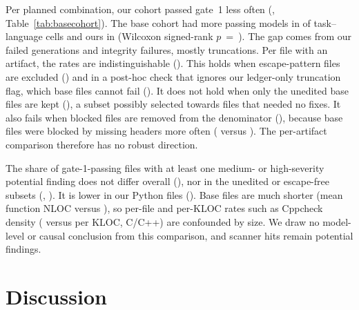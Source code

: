 \documentclass[conference]{IEEEtran}
\begin{document}
Per planned combination, our cohort passed gate~1 less often
(\cohDiffPlanned{}, Table~\ref{tab:basecohort}). The base cohort had more
passing models in \cohCellsBaseHigher{} of \cohCells{} task--language cells and
ours in \cohCellsOursHigher{} (Wilcoxon signed-rank $p$~=~\cohWilcoxonP{}). The gap
comes from our \oursNNoArtifactCCpp{} failed generations and
\oursNIntegrityCCpp{} integrity failures, mostly truncations. Per file with an
artifact, the rates are indistinguishable (\cohDiffArtifact{}). This holds when
escape-pattern files are excluded (\cohDiffArtifactSTwo{}) and in a post-hoc
check that ignores our ledger-only truncation flag, which base files cannot fail
(\cohDiffArtifactSFour{}). It does not hold when only the \baseNIdentical{}
unedited base files are kept (\cohDiffArtifactSOne{}), a subset possibly
selected towards files that needed no fixes. It also fails when blocked files
are removed from the denominator (\cohDiffArtifactSThree{}), because base files
were blocked by missing headers more often (\baseNBlocked{} versus
\oursNBlockedCCpp{}). The per-artifact comparison therefore has no robust
direction.

The share of gate-1-passing files with at least one medium- or high-severity
potential finding does not differ overall (\cohDiffMedHigh{}), nor in the
unedited or escape-free subsets (\cohDiffMedHighSOne{}, \cohDiffMedHighSTwo{}).
It is lower in our Python files (\cohDiffMedHighPy{}). Base files are much
shorter (mean function NLOC \cohNlocBase{} versus \cohNlocOurs{}), so per-file
and per-KLOC rates such as Cppcheck density (\cohCppcheckBase{} versus
\cohCppcheckOurs{} per KLOC, C/C++) are confounded by size. We draw no
model-level or causal conclusion from this comparison, and scanner hits remain
potential findings.

\begin{table}[t]
\centering
\caption{Secondary cohort comparison, ours / base study published outputs (\%,
except NLOC). Same pipeline; C, C++ and Python only; 200 planned combinations
per language and cohort.}
\label{tab:basecohort}
\scriptsize

\end{table}

\section{Discussion}
\end{document}
